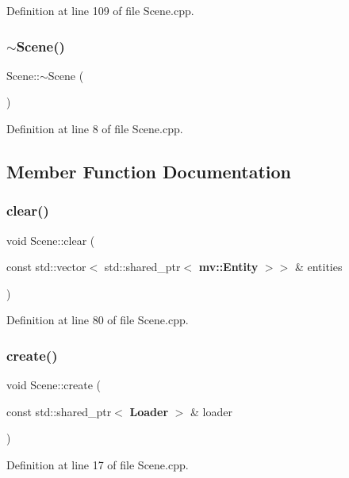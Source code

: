 Definition at line 109 of file Scene.\+cpp.

\mbox{\label{class_scene_a3b8cec2e32546713915f8c6303c951f1}} 
\subsubsection{$\sim$\+Scene()}
{\footnotesize\ttfamily Scene\+::$\sim$\+Scene (\begin{DoxyParamCaption}{ }\end{DoxyParamCaption})}



Definition at line 8 of file Scene.\+cpp.



\subsection{Member Function Documentation}
\mbox{\label{class_scene_a08d36ca08f508e6a75fc115415c71934}} 
\subsubsection{clear()}
{\footnotesize\ttfamily void Scene\+::clear (\begin{DoxyParamCaption}\item[{const std\+::vector$<$ std\+::shared\+\_\+ptr$<$ \textbf{ mv\+::\+Entity} $>$$>$ \&}]{entities }\end{DoxyParamCaption})}



Definition at line 80 of file Scene.\+cpp.

\mbox{\label{class_scene_afe7c244dc00704c6c522995ba5dd8e42}} 
\subsubsection{create()}
{\footnotesize\ttfamily void Scene\+::create (\begin{DoxyParamCaption}\item[{const std\+::shared\+\_\+ptr$<$ \textbf{ Loader} $>$ \&}]{loader }\end{DoxyParamCaption})}



Definition at line 17 of file Scene.\+cpp.

